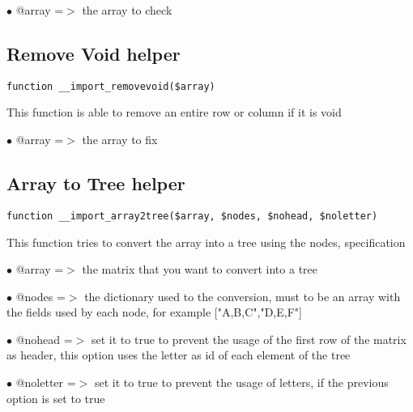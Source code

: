 \documentclass[a4paper]{book}
\begin{document}
\begin{compactitem}
\item[\color{myblue}$\bullet$] @array =$>$ the array to check
\end{compactitem}

\hypertarget{toc171}{}
\subsection{Remove Void helper}

\begin{lstlisting}
function __import_removevoid($array)
\end{lstlisting}

This function is able to remove an entire row or column if it is void

\begin{compactitem}
\item[\color{myblue}$\bullet$] @array =$>$ the array to fix
\end{compactitem}

\hypertarget{toc172}{}
\subsection{Array to Tree helper}

\begin{lstlisting}
function __import_array2tree($array, $nodes, $nohead, $noletter)
\end{lstlisting}

This function tries to convert the array into a tree using the nodes,
specification

\begin{compactitem}
\item[\color{myblue}$\bullet$] @array    =$>$ the matrix that you want to convert into a tree
\item[\color{myblue}$\bullet$] @nodes    =$>$ the dictionary used to the conversion, must to be an array with
             the fields used by each node, for example ["A,B,C","D,E,F"]
\item[\color{myblue}$\bullet$] @nohead   =$>$ set it to true to prevent the usage of the first row of the
             matrix as header, this option uses the letter as id of each
             element of the tree
\item[\color{myblue}$\bullet$] @noletter =$>$ set it to true to prevent the usage of letters, if the
             previous option is set to true
\end{compactitem}
\end{document}
